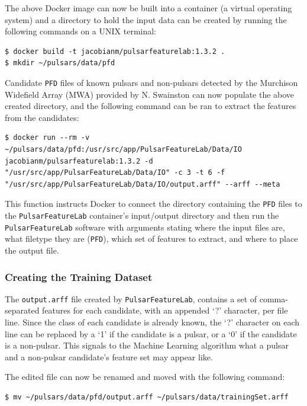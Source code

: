\documentclass{article}
\begin{document}
The above Docker image can now be built into a container (a virtual operating system) and a directory to hold the input data can be created by running the following commands on a UNIX terminal:

\begin{lstlisting}[numbers=none]
$ docker build -t jacobianm/pulsarfeaturelab:1.3.2 .
$ mkdir ~/pulsars/data/pfd
\end{lstlisting}

Candidate \verb|PFD| files of known pulsars and non-pulsars detected by the Murchison Widefield Array (MWA) provided by N. Swainston can now populate the above created directory, and the following command can be ran to extract the features from the candidates:

\begin{lstlisting}[numbers=none]
$ docker run --rm -v ~/pulsars/data/pfd:/usr/src/app/PulsarFeatureLab/Data/IO jacobianm/pulsarfeaturelab:1.3.2 -d "/usr/src/app/PulsarFeatureLab/Data/IO" -c 3 -t 6 -f "/usr/src/app/PulsarFeatureLab/Data/IO/output.arff" --arff --meta
\end{lstlisting}

This function instructs Docker to connect the directory containing the \verb|PFD| files to the \verb|PulsarFeatureLab| container's input/output directory and then run the \verb|PulsarFeatureLab| software with arguments stating where the input files are, what filetype they are (\verb|PFD|), which set of features to extract, and where to place the output file.

\subsubsection{Creating the Training Dataset}

The \verb|output.arff| file created by \verb|PulsarFeatureLab|, contains a set of comma-separated features for each candidate, with an appended `?' character, per file line. Since the class of each candidate is already known, the `?' character on each line can be replaced by a `1' if the candidate is a pulsar, or a `0' if the candidate is a non-pulsar. This signals to the Machine Learning algorithm what a pulsar and a non-pulsar candidate's feature set may appear like.

The edited file can now be renamed and moved with the following command:

\begin{lstlisting}[numbers=none]
$ mv ~/pulsars/data/pfd/output.arff ~/pulsars/data/trainingSet.arff
\end{lstlisting}
\end{document}

